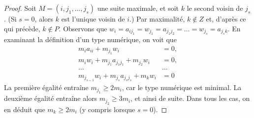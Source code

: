 \begin{proof}
\medskip\noindent
Soit $M = (i, j_1, \ldots, j_s)$ une suite maximale, et soit
$k$ le second voisin de $j_s$. (Si $s = 0$, alors $k$
est l'unique voisin de $i$.) Par maximalité, $k \not \in Z$
et, d'après ce qui précède, $k \not \in P$. Observons que
$w_i = a_{ij_1} = w_{j_1} = a_{j_1j_2} = \ldots = w_{j_s} =
a_{j_sk}$. En examinant la définition
d'un type numérique, on voit que
\begin{align*}
m_ia_{ii} + m_{j_1}w_i & = 0,\\
m_iw_i + m_{j_1}a_{j_1j_1} + m_{j_2}w_i & = 0,\\
\ldots & \ldots \\
m_{j_{s - 1}}w_i + m_{j_s}a_{j_sj_s} + m_kw_i & = 0
\end{align*}
La première égalité entraîne $m_{j_1} \geq 2m_i$, car le
type numérique est minimal. La deuxième égalité entraîne alors
$m_{j_2} \geq 3m_i$, et ainsi de suite. Dans tous les cas, on en déduit que
$m_k \geq 2m_i$ (y compris lorsque $s = 0$).


\end{proof}
